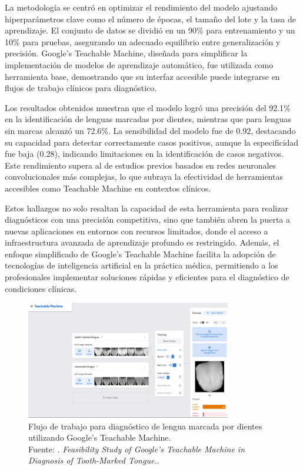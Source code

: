 La metodología se centró en optimizar el rendimiento del modelo ajustando hiperparámetros clave como el número de épocas, el tamaño del lote y la tasa de aprendizaje. El conjunto de datos se dividió en un 90\% para entrenamiento y un 10\% para pruebas, asegurando un adecuado equilibrio entre generalización y precisión. Google’s Teachable Machine, diseñada para simplificar la implementación de modelos de aprendizaje automático, fue utilizada como herramienta base, demostrando que su interfaz accesible puede integrarse en flujos de trabajo clínicos para diagnóstico.

Los resultados obtenidos muestran que el modelo logró una precisión del 92.1\% en la identificación de lenguas marcadas por dientes, mientras que para lenguas sin marcas alcanzó un 72.6\%. La sensibilidad del modelo fue de 0.92, destacando su capacidad para detectar correctamente casos positivos, aunque la especificidad fue baja (0.28), indicando limitaciones en la identificación de casos negativos. Este rendimiento supera al de estudios previos basados en redes neuronales convolucionales más complejas, lo que subraya la efectividad de herramientas accesibles como Teachable Machine en contextos clínicos.

Estos hallazgos no solo resaltan la capacidad de esta herramienta para realizar diagnósticos con una precisión competitiva, sino que también abren la puerta a nuevas aplicaciones en entornos con recursos limitados, donde el acceso a infraestructura avanzada de aprendizaje profundo es restringido. Además, el enfoque simplificado de Google’s Teachable Machine facilita la adopción de tecnologías de inteligencia artificial en la práctica médica, permitiendo a los profesionales implementar soluciones rápidas y eficientes para el diagnóstico de condiciones clínicas.

\begin{figure}[H]
	\begin{center}
		\includegraphics[width=0.80\textwidth]{2/figures/6.jpeg}
		\caption[Flujo de trabajo en Google’s Teachable Machine]{Flujo de trabajo para diagnóstico de lengua marcada por dientes utilizando Google’s Teachable Machine. \\
		Fuente: \cite{Feasibility2020}. \textit{Feasibility Study of Google's Teachable Machine in Diagnosis of Tooth-Marked Tongue.}.}
		\label{2:fig128}
	\end{center}
\end{figure}

